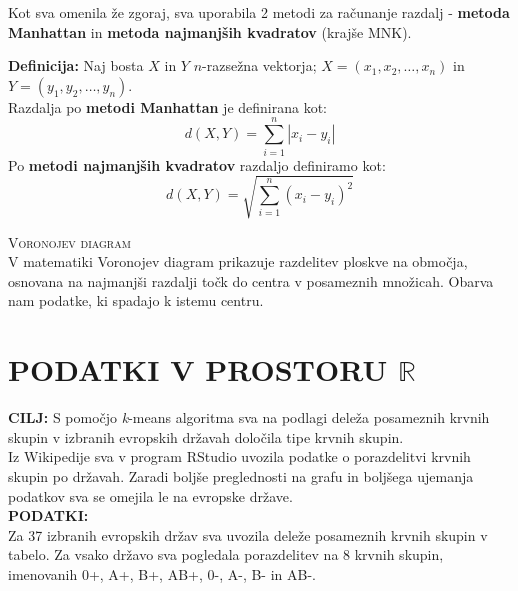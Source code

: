 \documentclass[11pt, a4paper]{article}
\begin{document}
\noindent Kot sva omenila že zgoraj, sva uporabila 2 metodi za računanje razdalj - \textbf{metoda Manhattan} in \textbf{metoda najmanjših kvadratov} (krajše MNK).

\vspace{0.5 cm}

\noindent \textbf{Definicija:} Naj bosta $X$ in $Y$ $n$-razsežna vektorja; $X = (x_1, x_2, \ldots, x_n)$ in $Y = (y_1, y_2,\ldots, y_n).$ \\
Razdalja po \textbf{metodi Manhattan} je definirana kot: 
\begin{equation}
d(X, Y) = \sum_{i = 1}^n | x_i - y_i |
\end{equation}
Po \textbf{metodi najmanjših kvadratov} razdaljo definiramo kot:
\begin{equation}
d(X, Y) = \sqrt {\sum_{i = 1}^n (x_i - y_i)^2}
\end{equation}

\noindent \textsc{Voronojev diagram} \\

\noindent V matematiki Voronojev diagram prikazuje razdelitev ploskve na območja, osnovana na najmanjši razdalji točk do centra v posameznih množicah. Obarva nam podatke, ki spadajo k istemu centru. 

\vspace{0,5 cm}

\newpage

\section{PODATKI V PROSTORU $\mathbb{R}$}

\noindent \textbf{CILJ:} S pomočjo \textsl{k}-means algoritma sva na podlagi deleža posameznih krvnih skupin v izbranih evropskih državah določila tipe krvnih skupin. \\

\noindent Iz Wikipedije sva v program RStudio uvozila podatke o porazdelitvi krvnih skupin po državah. Zaradi boljše preglednosti na grafu in boljšega ujemanja podatkov sva se omejila le na evropske države. \\

\noindent \textbf{PODATKI:} \\
\noindent Za 37 izbranih evropskih držav sva uvozila deleže posameznih krvnih skupin v tabelo.
\noindent Za vsako državo sva pogledala porazdelitev na 8 krvnih skupin, imenovanih 0+, A+, B+, AB+, 0-, A-, B- in AB-.\\
\end{document}
